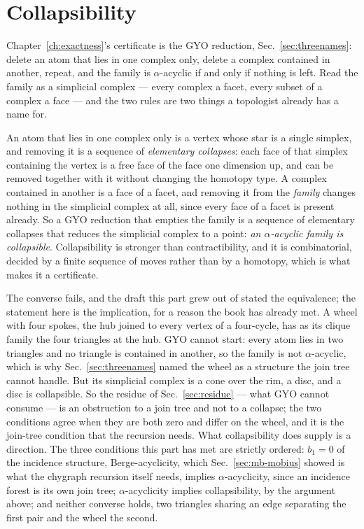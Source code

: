 \section{Collapsibility}
\label{sec:mb-collapse}

Chapter~\ref{ch:exactness}'s certificate is the GYO reduction, Sec.~\ref{sec:threenames}:
delete an atom that lies in one complex only, delete a complex contained in
another, repeat, and the family is $\alpha$-acyclic if and only if nothing
is left. Read the family as a simplicial complex --- every complex a facet,
every subset of a complex a face --- and the two rules are two things a
topologist already has a name for.

An atom that lies in one complex only is a vertex whose star is a single
simplex, and removing it is a sequence of \emph{elementary collapses}: each
face of that simplex containing the vertex is a free face of the face one
dimension up, and can be removed together with it without changing the
homotopy type. A complex contained in another is a face of a facet, and
removing it from the \emph{family} changes nothing in the simplicial complex
at all, since every face of a facet is present already. So a GYO reduction
that empties the family is a sequence of elementary collapses that reduces
the simplicial complex to a point: \emph{an $\alpha$-acyclic family is
collapsible}. Collapsibility is stronger than contractibility, and it is
combinatorial, decided by a finite sequence of moves rather than by a
homotopy, which is what makes it a certificate.

The converse fails, and the draft this part grew out of stated the
equivalence; the statement here is the implication, for a reason the book
has already met. A wheel with four spokes, the hub joined to every vertex of
a four-cycle, has as its clique family the four triangles at the hub. GYO
cannot start: every atom lies in two triangles and no triangle is contained
in another, so the family is not $\alpha$-acyclic, which is why
Sec.~\ref{sec:threenames} named the wheel as a structure the join tree
cannot handle. But its simplicial complex is a cone over the rim, a disc,
and a disc is collapsible. So the residue of Sec.~\ref{sec:residue} --- what
GYO cannot consume --- is an obstruction to a join tree and not to a collapse;
the two conditions agree when they are both zero and differ on the wheel,
and it is the join-tree condition that the recursion needs. What
collapsibility does supply is a direction. The three conditions this part
has met are strictly ordered: $b_{1}=0$ of the incidence structure,
Berge-acyclicity, which Sec.~\ref{sec:mb-mobius} showed is what the
chygraph recursion itself needs, implies $\alpha$-acyclicity, since an
incidence forest is its own join tree; $\alpha$-acyclicity implies collapsibility, by the argument
above; and neither converse holds, two triangles sharing an edge separating
the first pair and the wheel the second.

